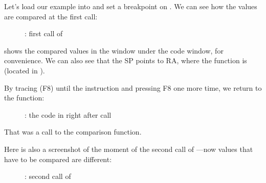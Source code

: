 ﻿\clearpage
{}
\myindex{\olly}

Let's load our example into \olly and set a breakpoint on \comp.
We can see how the values are compared at the first \comp call:

\begin{figure}[H]
\centering
{}
\caption{\olly: first call of \comp}
\label{fig:qsort_olly1}
\end{figure}

\olly shows the compared values in the window under the code window, for convenience.
We can also see that the \ac{SP} points to \ac{RA}, where the \qsort function is (located in ).

\clearpage
By tracing (F8) until the  instruction and pressing F8 one more time, we return to the \qsort function:

\begin{figure}[H]
\centering
{}
\caption{\olly: the code in \qsort right after \comp call}
\label{fig:qsort_olly2}
\end{figure}

That was a call to the comparison function.

\clearpage
Here is also a screenshot of the moment of the second call of \comp{}---now values that have to be compared are different:

\begin{figure}[H]
\centering
{}
\caption{\olly: second call of \comp}
\label{fig:qsort_olly3}
\end{figure}
